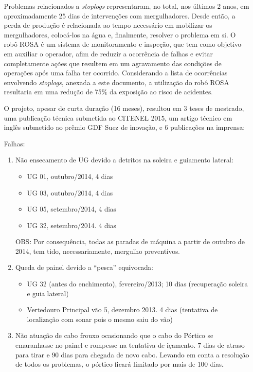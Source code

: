 Problemas relacionados a \textit{stoplogs} representaram, no total, nos últimos
2 anos, em aproximadamente 25 dias de intervenções com mergulhadores. Desde
então, a perda de produção é relacionada ao tempo necessário em mobilizar os
mergulhadores, colocá-los na água e, finalmente, resolver o problema em si. O
robô ROSA é um sistema de monitoramento e inspeção, que tem como objetivo
em auxiliar o operador, afim de reduzir a ocorrência de falhas e evitar
completamente ações que resultem em um agravamento das condições de operações
após uma falha ter ocorrido. Considerando a lista de ocorrências envolvendo
\textit{stoplogs}, anexada a este documento, a utilização do robô ROSA
resultaria em uma redução de 75\% da exposição ao risco de acidentes. 

O projeto, apesar de curta duração (16 meses), resultou em 3 teses de 
mestrado, uma publicação técnica submetida ao CITENEL 2015, um artigo técnico 
em inglês submetido ao prêmio GDF Suez de inovação, e 6 publicações na imprensa: 

Falhas:

\begin{enumerate}
  \item Não ensecamento de UG devido a detritos na soleira e guiamento lateral:
  		\begin{itemize}
  		  \item UG 01, outubro/2014, 4 dias
  		  \item UG 03, outubro/2014, 4 dias
  		  \item UG 05, setembro/2014, 4 dias
  		  \item UG 32, setembro/2014. 4 dias	
  		\end{itemize}
  		OBS: Por consequência, todas as paradas de máquina a partir de
  		outubro de 2014, tem tido, necessariamente, mergulho
  		preventivos. 
  \item Queda de painel devido a “pesca” equivocada:
  		\begin{itemize}
  		  \item UG 32 (antes do enchimento), fevereiro/2013; 10 dias (recuperação
  		  soleira e guia lateral)
  		  \item Vertedouro Principal vão 5, dezembro 2013. 4 dias (tentativa de
  		  localização com sonar pois o mesmo saiu do vão)
  		\end{itemize}
  \item Não atuação de cabo frouxo ocasionando que o cabo do Pórtico se
  emaranhasse no painel e rompesse na tentativa de içamento. 7 dias de atraso 
  para tirar e 90 dias para chegada de novo cabo. Levando em conta a resolução 
  de todos os problemas, o pórtico ficará limitado por mais de 100 dias.
\end{enumerate}
 
     
